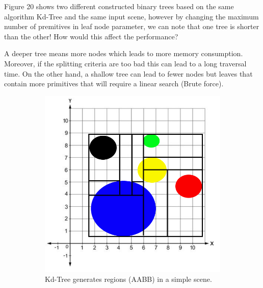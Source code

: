 \documentclass[11pt,a4paper]{article}
\begin{document}
Figure 20 shows two different constructed binary trees based on the same algorithm Kd-Tree and the same input scene, however by changing the maximum number of premitives in leaf node parameter, we can note that one tree is shorter than the other! How would this affect the performance? 
\\
\noindent

A deeper tree means more nodes which leads to more memory consumption. Moreover, if the splitting criteria are too bad this can lead to a long traversal time. On the other hand, a shallow tree can lead to fewer nodes but leaves that contain more primitives that will require a linear search (Brute force).    


\begin{figure}[H]	
     \centering
     \begin{subfigure}[b]{0.3\textwidth}
         \centering
         \captionsetup{justification=centering}
         \includegraphics[width=\textwidth]{images/kdtree/visaul_scene_1.png}
         \caption{Kd-Tree generates regions (AABB) in a simple scene.}
         \label{fig:pi_4000}
     \end{subfigure}
     \hfill
     \begin{subfigure}[b]{0.6\textwidth}
         \centering
         \captionsetup{justification=centering}

\end{subfigure}
\end{figure}
\end{document}
